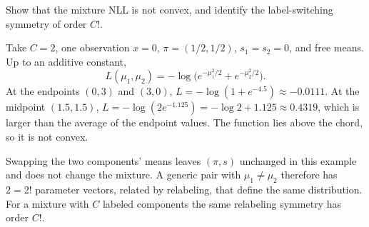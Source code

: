 \begin{hwqbox}
Show that the mixture NLL is not convex, and identify the label-switching symmetry of order $C!$.
\end{hwqbox}
\begin{hwsolbox}
Take $C=2$, one observation $x=0$, $\pi=(1/2,1/2)$, $s_1=s_2=0$, and free means. Up to an additive constant,
\[
L(\mu_1,\mu_2)=-\log\big(e^{-\mu_1^2/2}+e^{-\mu_2^2/2}\big).
\]
At the endpoints $(0,3)$ and $(3,0)$, $L=-\log(1+e^{-4.5})\approx -0.0111$. At the midpoint $(1.5,1.5)$, $L=-\log(2e^{-1.125})=-\log 2+1.125\approx 0.4319$, which is larger than the average of the endpoint values. The function lies above the chord, so it is not convex.

Swapping the two components' means leaves $(\pi,s)$ unchanged in this example and does not change the mixture. A generic pair with $\mu_1\ne\mu_2$ therefore has $2=2!$ parameter vectors, related by relabeling, that define the same distribution. For a mixture with $C$ labeled components the same relabeling symmetry has order $C!$.
\end{hwsolbox}
